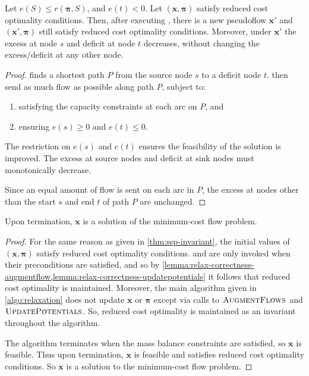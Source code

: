 \begin{lemma} \label{lemma:relax-correctness-augmentflow}
Let $e(S) \leq r(\boldsymbol{\pi},S)$, and $e(t) < 0$. Let $\left(\mathbf{x},\boldsymbol{\pi}\right)$ satisfy reduced cost optimality conditions. Then, after executing , there is a new pseudoflow $\mathbf{x}'$ and $\left(\mathbf{x}',\boldsymbol{\pi}\right)$ still satisfy reduced cost optimality conditions. Moreover, under $\mathbf{x}'$ the excess at node $s$ and deficit at node $t$ decreases, without changing the excess/deficit at any other node\footnotemark.
\end{lemma}
\begin{proof}
 finds a shortest path $P$ from the source node $s$ to a deficit node $t$.  then send as much flow as possible along path $P$, subject to:
\begin{enumerate}
    \item satisfying the capacity constraints at each arc on $P$, and
    \item ensuring $e(s) \geq 0$ and $e(t) \leq 0$.
\end{enumerate}
The restriction on $e(s)$ and $e(t)$ ensures the feasibility of the solution is improved. The excess at source nodes and deficit at sink nodes must monotonically decrease\footnotemark.

Since an equal amount of flow is sent on each arc in $P$, the excess at nodes other than the start $s$ and end $t$ of path $P$ are unchanged.
\end{proof}

\begin{thm}[Correctness] \label{thm:relax-correctness}
Upon termination, $\mathbf{x}$ is a solution of the minimum-cost flow problem.
\end{thm}
\begin{proof}
For the same reason as given in \cref{thm:ssp-invariant}, the initial values of $\left(\mathbf{x},\boldsymbol{\pi}\right)$ satisfy reduced cost optimality conditions.  and  are only invoked when their preconditions are satisfied, and so by \cref{lemma:relax-correctness-augmentflow,lemma:relax-correctness-updatepotentials} it follows that reduced cost optimality is maintained. Moreover, the main algorithm given in \cref{algo:relaxation} does not update $\mathbf{x}$ or $\boldsymbol{\pi}$ except via calls to $\textproc{AugmentFlows}$ and $\textproc{UpdatePotentials}$. So, reduced cost optimality is maintained as an invariant throughout the algorithm.

The algorithm terminates when the mass balance constraints are satisfied, so $\mathbf{x}$ is feasible. Thus upon termination, $\mathbf{x}$ is feasible and satisfies reduced cost optimality conditions. So $\mathbf{x}$ is a solution to the minimum-cost flow problem. 
\end{proof}

